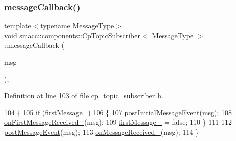 \subsubsection{\texorpdfstring{message\+Callback()}{messageCallback()}}
{\footnotesize\ttfamily template$<$typename Message\+Type$>$ \\
void \hyperlink{classsmacc_1_1components_1_1CpTopicSubscriber}{smacc\+::components\+::\+Cp\+Topic\+Subscriber}$<$ Message\+Type $>$\+::message\+Callback (\begin{DoxyParamCaption}\item[{const Message\+Type \&}]{msg }\end{DoxyParamCaption})\hspace{0.3cm}{\ttfamily [inline]}, {\ttfamily [private]}}



Definition at line 103 of file cp\+\_\+topic\+\_\+subscriber.\+h.


\begin{DoxyCode}
104     \{
105         \textcolor{keywordflow}{if} (\hyperlink{classsmacc_1_1components_1_1CpTopicSubscriber_aadbaf8c0f0a2a5bea38f41356528f41c}{firstMessage\_})
106         \{
107             \hyperlink{classsmacc_1_1components_1_1CpTopicSubscriber_a9e1c210ebc8d5ef0c837e8bd9b83f754}{postInitialMessageEvent}(msg);
108             \hyperlink{classsmacc_1_1components_1_1CpTopicSubscriber_ab8e319857951489298faefa4882e49cc}{onFirstMessageReceived\_}(msg);
109             \hyperlink{classsmacc_1_1components_1_1CpTopicSubscriber_aadbaf8c0f0a2a5bea38f41356528f41c}{firstMessage\_} = \textcolor{keyword}{false};
110         \}
111 
112         \hyperlink{classsmacc_1_1components_1_1CpTopicSubscriber_a002ca59f74f784f14597d1c0e057d298}{postMessageEvent}(msg);
113         \hyperlink{classsmacc_1_1components_1_1CpTopicSubscriber_aeec04e64cad880bd49d401c2a474c6e9}{onMessageReceived\_}(msg);
114     \}
\end{DoxyCode}
\mbox{\label{classsmacc_1_1components_1_1CpTopicSubscriber_ac7b226871cec5c4358cc635e02f56bf2}} 
